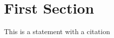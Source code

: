 \documentclass[english,a4paper,12pt]{article}
\begin{document}
\section{First Section}
This is a statement with a citation\cite{blogs2013}



 
\end{document}
